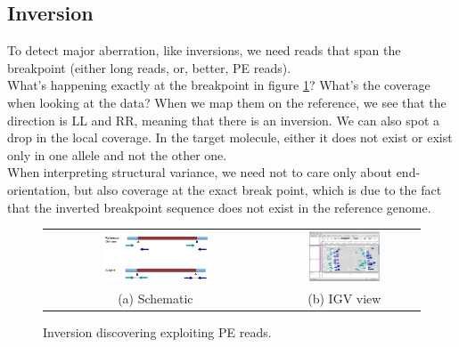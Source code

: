\subsection{Inversion}
To detect major aberration, like inversions, we need reads that span the breakpoint (either long reads, or, better, PE reads). \\
What's happening exactly at the breakpoint in figure \ref{fig:inversion}? What's the coverage when looking at the data?  When we map them on the reference, we see that the direction is LL and RR, meaning that there is an inversion.
We can also spot a drop in the local coverage.
In the target molecule, either it does not exist or exist only in one allele and not the other one. \\
When interpreting structural variance, we need not to care only about end-orientation, but also coverage at the exact break point, which is due to the fact that the inverted breakpoint sequence does not exist in the reference genome.



\begin{figure}[H]
\begin{tabular}{cc}
  \includegraphics[width=0.5\textwidth]{inversion.png} &   \includegraphics[width=0.5\textwidth]{inversion_igv.png} \\
(a) Schematic & (b) IGV view \\[6pt]

\end{tabular}
\caption{Inversion discovering exploiting PE reads.}
\label{fig:inversion}
\end{figure}



